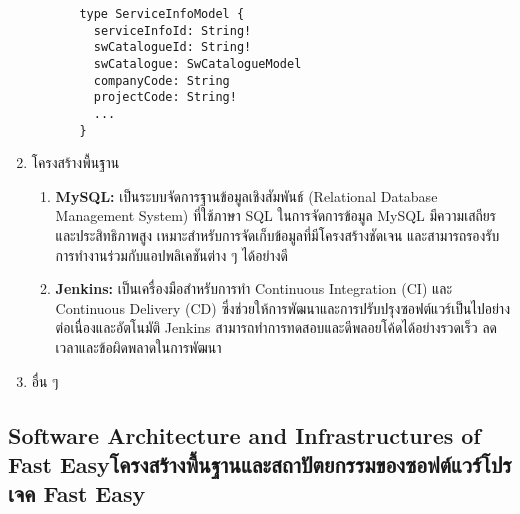 \begin{enumerate}
\begin{enumerate}
\begin{enumerate}
\begin{center}
\begin{lstlisting}
type ServiceInfoModel {
  serviceInfoId: String!
  swCatalogueId: String!
  swCatalogue: SwCatalogueModel
  companyCode: String
  projectCode: String!
  ...
}
            \end{lstlisting}
         \end{center}

        \end{enumerate}
    \end{enumerate}
    \item โครงสร้างพื้นฐาน
    \begin{enumerate}
        \item \textbf{MySQL:} เป็นระบบจัดการฐานข้อมูลเชิงสัมพันธ์ (Relational Database Management System) ที่ใช้ภาษา SQL ในการจัดการข้อมูล MySQL มีความเสถียรและประสิทธิภาพสูง เหมาะสำหรับการจัดเก็บข้อมูลที่มีโครงสร้างชัดเจน และสามารถรองรับการทำงานร่วมกับแอปพลิเคชันต่าง ๆ ได้อย่างดี
        \item \textbf{Jenkins:} เป็นเครื่องมือสำหรับการทำ Continuous Integration (CI) และ Continuous Delivery (CD) ซึ่งช่วยให้การพัฒนาและการปรับปรุงซอฟต์แวร์เป็นไปอย่างต่อเนื่องและอัตโนมัติ Jenkins สามารถทำการทดสอบและดีพลอยโค้ดได้อย่างรวดเร็ว ลดเวลาและข้อผิดพลาดในการพัฒนา
    \end{enumerate}
    \item อื่น ๆ
\end{enumerate}
\subsection{\ifenglish Software Architecture and Infrastructures of Fast Easy\else โครงสร้างพื้นฐานและสถาปัตยกรรมของซอฟต์แวร์โปรเจค Fast Easy\fi}